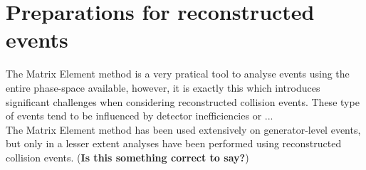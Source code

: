 %

\section{Preparations for reconstructed events} \label{sec::RecoAdapt}


The Matrix Element method is a very pratical tool to analyse events using the entire phase-space available, however, it is exactly this which introduces significant challenges when considering reconstructed collision events. These type of events tend to be influenced by detector inefficiencies or ...
\\


The Matrix Element method has been used extensively on generator-level events, but only in a lesser extent analyses have been performed using reconstructed collision events. (\textbf{Is this something correct to say?})
\\

